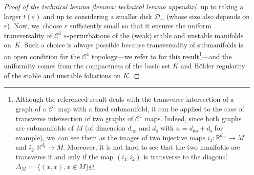 \documentclass[JEP,XML,SOM,Unicode,NoEqCountersInSection,NoFloatCountersInSection,published]{cedram}
\newcommand{\rs}{\mathrm{s}}
\newcommand{\ruo}{\mathrm{uo}}
\theoremstyle{definition}
\theoremstyle{plain}
\newcommand{\Ccal}{\mathcal{C}}
\newcommand{\D}{\mathcal{D}}
\newcommand{\R}{\mathbb{R}}
\begin{document}
\begin{appendix}
\begin{proof}[Proof of the technical lemma \ref{lemma: technical lemma appendix}]
up to taking a larger $t (\varepsilon)$ and up to considering a smaller disk $\D_-$ (whose size also depends on $\varepsilon$). Now, we~choose $\varepsilon$ sufficiently small so that it ensures the uniform transversality of $\Ccal^1$ $\varepsilon$-perturbations of the (weak) stable and unstable manifolds on~$K$. Such a choice is always possible because transversality of submanifolds is an open condition for the $\Ccal^1$ topology---we refer to \cite[\S 5.3.3, p.\,88]{laudenbach-book} for this result\footnote{Although the referenced result deals with the transverse intersection of a graph of a $\Ccal^1$ map with a fixed submanifold, it can be applied to the case of transverse intersection of two graphs of $\Ccal^1$ maps. Indeed, since both graphs are submanifolds of $M$ (of dimension $d_{\ruo}$ and $d_\rs$ with $n = d_{\ruo} + d_\rs$ for example), we~can see them as the images of two injective maps $i_1: \R^{d_{\ruo}} \to M$ and $i_2: \R^{d_\rs} \to M$. Moreover, it is not hard to see that the two manifolds are transverse if and only if the map $(i_1,i_2)$ is transverse to the diagonal $\Delta_M:= \{ (x,x), x \in M\}$}---and the uniformity comes from the compactness of the basic set $K$ and  Hölder regularity of the stable and unstable foliations on $K$.


\end{proof}
\end{appendix}
\end{document}
